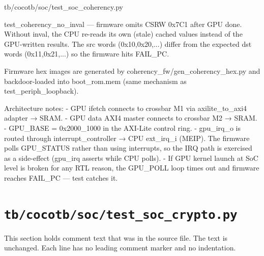 \begin{relocated}{tb/cocotb/soc/test_soc_coherency.py}
\begin{textblock}
test_coherency_no_inval — firmware omits CSRW 0x7C1 after GPU done.
Without inval, the CPU re-reads its own (stale) cached values instead of
the GPU-written results.  The src words (0x10,0x20,...) differ from the
expected dst words (0x11,0x21,...) so the firmware hits FAIL_PC.

Firmware hex images are generated by coherency_fw/gen_coherency_hex.py and
backdoor-loaded into boot_rom.mem (same mechanism as test_periph_loopback).

Architecture notes:
- GPU ifetch connects to crossbar M1 via axilite_to_axi4 adapter → SRAM.
- GPU data AXI4 master connects to crossbar M2 → SRAM.
- GPU_BASE = 0x2000_1000 in the AXI-Lite control ring.
- gpu_irq_o is routed through interrupt_controller → CPU ext_irq_i (MEIP).
The firmware polls GPU_STATUS rather than using interrupts, so the IRQ
path is exercised as a side-effect (gpu_irq asserts while CPU polls).
- If GPU kernel launch at SoC level is broken for any RTL reason, the
GPU_POLL loop times out and firmware reaches FAIL_PC — test catches it.
\end{textblock}

\end{relocated}

\section{\texttt{tb/cocotb/soc/test\_soc\_crypto.py}}\label{tm:suite:soc-test-soc-crypto}

This section holds comment text that was in the source file. The text is unchanged. Each line has no leading comment marker and no indentation.

